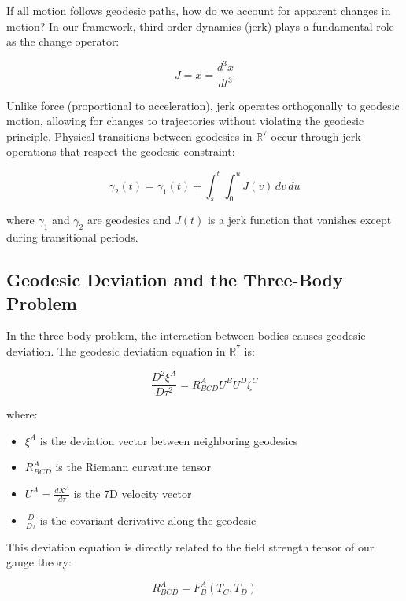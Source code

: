 \documentclass{article}
\begin{document}
If all motion follows geodesic paths, how do we account for apparent changes in motion? In our framework, third-order dynamics (jerk) plays a fundamental role as the change operator:

\begin{equation}
J = \dddot{x} = \frac{d^3x}{dt^3}
\end{equation}

Unlike force (proportional to acceleration), jerk operates orthogonally to geodesic motion, allowing for changes to trajectories without violating the geodesic principle. Physical transitions between geodesics in $\mathbb{R}^7$ occur through jerk operations that respect the geodesic constraint:

\begin{equation}
\gamma_2(t) = \gamma_1(t) + \int_s^t \int_0^u J(v) \, dv \, du
\end{equation}

where $\gamma_1$ and $\gamma_2$ are geodesics and $J(t)$ is a jerk function that vanishes except during transitional periods.

\subsection{Geodesic Deviation and the Three-Body Problem}

In the three-body problem, the interaction between bodies causes geodesic deviation. The geodesic deviation equation in $\mathbb{R}^7$ is:

\begin{equation}
\frac{D^2 \xi^A}{D\tau^2} = R^A_{BCD} U^B U^D \xi^C
\end{equation}

where:
\begin{itemize}
\item $\xi^A$ is the deviation vector between neighboring geodesics
\item $R^A_{BCD}$ is the Riemann curvature tensor
\item $U^A = \frac{dX^A}{d\tau}$ is the 7D velocity vector
\item $\frac{D}{D\tau}$ is the covariant derivative along the geodesic
\end{itemize}

This deviation equation is directly related to the field strength tensor of our gauge theory:

\begin{equation}
R^A_{BCD} = F^A_{B}(T_C, T_D)
\end{equation}
\end{document}
